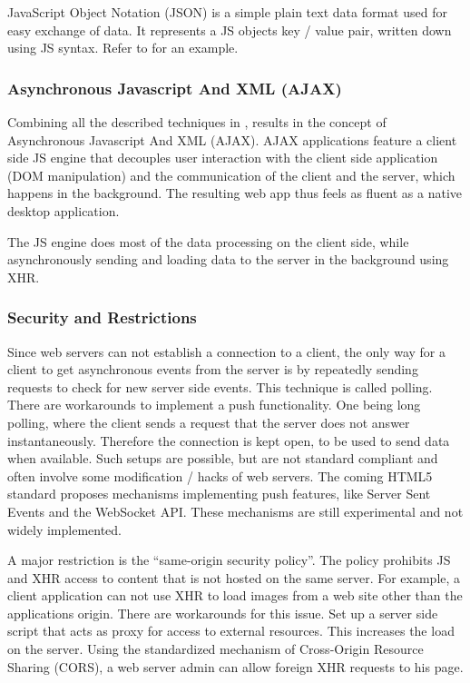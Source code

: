 JavaScript Object Notation (JSON) is a simple plain text data format used for easy exchange of data. It represents a JS objects key / value pair, written down using JS syntax. Refer to  for an example.



\subsubsection{Asynchronous Javascript And XML (AJAX)}
\label{sec:ajax}

Combining all the described techniques in , results in the concept of Asynchronous Javascript And XML (AJAX).
AJAX applications feature a client side JS engine that decouples user interaction with the client side application (DOM manipulation) and the communication of the client and the server, which happens in the background.
The resulting web app thus feels as fluent as a native desktop application.

The JS engine does most of the data processing on the client side, while asynchronously sending and loading data to the server in the background using XHR.


\subsubsection{Security and Restrictions}
\label{sec:webapp_security}

Since web servers can not establish a connection to a client, the only way for a client to get asynchronous events from the server is by repeatedly sending requests to check for new server side events.
This technique is called polling.
There are workarounds to implement a push functionality.
One being long polling, where the client sends a request that the server does not answer instantaneously.
Therefore the connection is kept open, to be used to send data when available.
Such setups are possible, but are not standard compliant and often involve some modification / hacks of web servers.
The coming HTML5 standard proposes mechanisms implementing push features, like Server Sent Events and the WebSocket API. These mechanisms are still experimental and not widely implemented.

A major restriction is the ``same-origin security policy''.
The policy prohibits JS and XHR access to content that is not hosted on the same server.
For example, a client application can not use XHR to load images from a web site other than the applications origin.
There are workarounds for this issue. Set up a server side script that acts as proxy for access to external resources. This increases the load on the server.
Using the standardized mechanism of Cross-Origin Resource Sharing (CORS), a web server admin can allow foreign XHR requests to his page.



